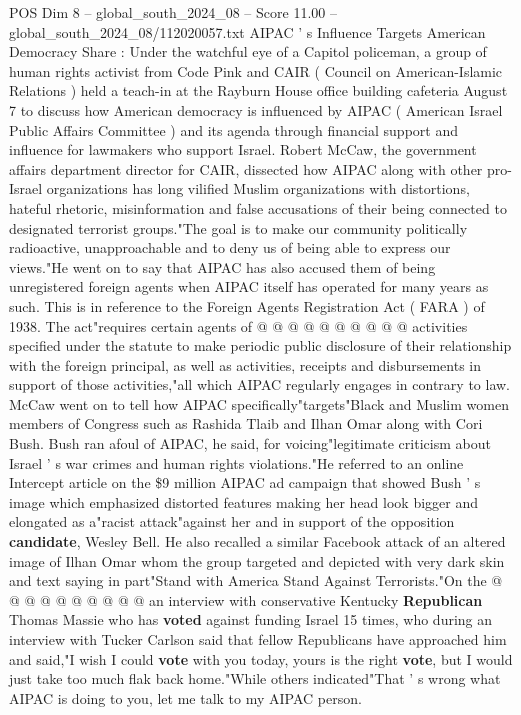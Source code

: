 \begin{textsample}{POS Dim 8 – global\_south\_2024\_08 – Score 11.00 – global\_south\_2024\_08/112020057.txt}  \label{ex:f8_pos_176}
AIPAC ' s Influence Targets American Democracy Share : Under the watchful eye of a Capitol policeman, a group of human rights activist from Code Pink and CAIR ( Council on American-Islamic Relations ) held a teach-in at the Rayburn House office building cafeteria August 7 to discuss how American democracy is influenced by AIPAC ( American Israel Public Affairs Committee ) and its agenda through financial support and influence for lawmakers who support Israel.
Robert McCaw, the government affairs department director for CAIR, dissected how AIPAC along with other pro-Israel organizations has long vilified Muslim organizations with distortions, hateful rhetoric, misinformation and false accusations of their being connected to designated terrorist groups."The goal is to make our community politically radioactive, unapproachable and to deny us of being able to express our views."He went on to say that AIPAC has also accused them of being unregistered foreign agents when AIPAC itself has operated for many years as such.
This is in reference to the Foreign Agents Registration Act ( FARA ) of 1938.
The act"requires certain agents of @ @ @ @ @ @ @ @ @ @ activities specified under the statute to make periodic public disclosure of their relationship with the foreign principal, as well as activities, receipts and disbursements in support of those activities,"all which AIPAC regularly engages in contrary to law.
McCaw went on to tell how AIPAC specifically"targets"Black and Muslim women members of Congress such as Rashida Tlaib and Ilhan Omar along with Cori Bush.
Bush ran afoul of AIPAC, he said, for voicing"legitimate criticism about Israel ' s war crimes and human rights violations."He referred to an online Intercept article on the \$9 million AIPAC ad campaign that showed Bush ' s image which emphasized distorted features making her head look bigger and elongated as a"racist attack"against her and in support of the opposition \textbf{candidate}, Wesley Bell.
He also recalled a similar Facebook attack of an altered image of Ilhan Omar whom the group targeted and depicted with very dark skin and text saying in part"Stand with America Stand Against Terrorists."On the @ @ @ @ @ @ @ @ @ @ an interview with conservative Kentucky \textbf{Republican} Thomas Massie who has \textbf{voted} against funding Israel 15 times, who during an interview with Tucker Carlson said that fellow Republicans have approached him and said,"I wish I could \textbf{vote} with you today, yours is the right \textbf{vote}, but I would just take too much flak back home."While others indicated"That ' s wrong what AIPAC is doing to you, let me talk to my AIPAC person.

\end{textsample}
